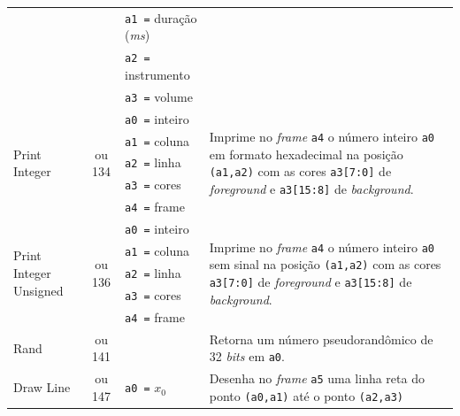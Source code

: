 \begin{longtable}{|l|c|p{3cm}|l |}
            & & \texttt{a1 =} duração (\textit{ms}) & \\*
            & & \texttt{a2 =} instrumento & \\*
            & & \texttt{a3 =} volume      & \\
        \hline
        \multirow{5}{*}{Print Integer}      & \multirow{5}{*}{\parbox{0.6cm}{ ou 134}}
              & \texttt{a0 =} inteiro     & \multirow{5}{*}{\parbox{7cm}{Imprime no \textit{frame} \texttt{a4} o número inteiro \texttt{a0} em formato hexadecimal na
                                                posição \texttt{(a1,a2)} com as cores \texttt{a3[7:0]} de \textit{foreground} e \texttt{a3[15:8]} de \textit{background}.}}\\*
            & & \texttt{a1 =} coluna      & \\*
            & & \texttt{a2 =} linha       & \\*
            & & \texttt{a3 =} cores       & \\*
            & & \texttt{a4 =} frame       & \\
        \hline
        \multirow{5}{*}{Print Integer Unsigned} & \multirow{5}{*}{\parbox{0.6cm}{ ou 136}}
              & \texttt{a0 =} inteiro     & \multirow{5}{*}{\parbox{7cm}{Imprime no \textit{frame} \texttt{a4} o número inteiro \texttt{a0} sem sinal na
                                                posição \texttt{(a1,a2)} com as cores \texttt{a3[7:0]} de \textit{foreground} e \texttt{a3[15:8]} de \textit{background}.}}\\*
            & & \texttt{a1 =} coluna      & \\*
            & & \texttt{a2 =} linha       & \\*
            & & \texttt{a3 =} cores       & \\*
            & & \texttt{a4 =} frame       & \\
        \hline
        \multirow{3}{*}{Rand}               & \multirow{3}{*}{\parbox{0.6cm}{ ou 141}}
            & & \multirow{3}{*}{\parbox{7cm}{Retorna um número pseudorandômico de 32 \textit{bits} em \texttt{a0}.}}\\*
            & & & \\*
            & & & \\
        \hline
        \multirow{6}{*}{Draw Line}          & \multirow{6}{*}{\parbox{0.6cm}{ ou 147}}
              & \texttt{a0 =} $x_0$       & \multirow{6}{*}{\parbox{7cm}{Desenha no \textit{frame} \texttt{a5} uma linha reta do ponto \texttt{(a0,a1)} até o ponto \texttt{(a2,a3)}
}}
\end{longtable}
